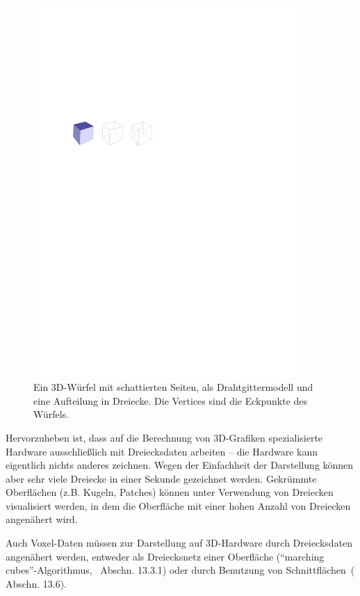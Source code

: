 \documentclass[twoside,a4paper,fleqn,12pt]{article}
\begin{document}
\begin{figure}[h]
  \centering
  \includegraphics[width=10cm]{drahtgitter}
  \caption{Ein 3D-Würfel mit schattierten Seiten, als Drahtgittermodell und eine Aufteilung in Dreiecke. Die Vertices
  sind die Eckpunkte des Würfels.}
  \label{fig:wirecube}
\end{figure}

Hervorzuheben ist, dass auf die Berechnung von 3D-Grafiken spezialisierte Hardware 
ausschließlich mit Dreiecksdaten arbeiten -- die Hardware kann eigentlich nichts anderes zeichnen. Wegen der Einfachheit der Darstellung
können aber sehr viele Dreiecke in einer Sekunde gezeichnet werden. Gekrümmte Oberflächen (z.B. Kugeln, Patches) können unter Verwendung von Dreiecken visualisiert werden,
in dem die Oberfläche mit einer hohen Anzahl von Dreiecken angenähert wird.

Auch Voxel-Daten müssen zur Darstellung auf 3D-Hardware durch Dreiecksdaten angenähert werden,
entweder als Dreiecksnetz einer Oberfläche (``marching cubes''-Algorithmus,~\cite{watt_de} Abschn. 13.3.1)
oder durch Benutzung von Schnittflächen~(\cite{watt_de} Abschn. 13.6).
\end{document}
